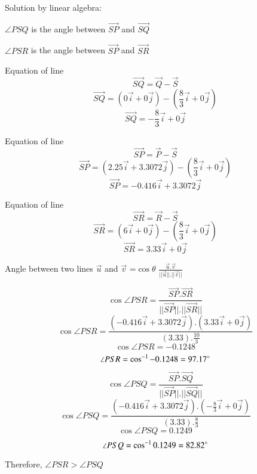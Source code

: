 Solution by linear algebra:

$\angle{PSQ}$ is the angle between $\vec{SP}$ and $\vec{SQ}$

$\angle{PSR}$ is the angle between $\vec{SP}$ and $\vec{SR}$

Equation of line $$\vec{SQ} = \vec{Q}-\vec{S}$$
$$\vec{SQ} = (0\vec{i}+0\vec{j}) - (\frac{8}{3}\vec{i}+0\vec{j})$$
$$\vec{SQ} = -\frac{8}{3}\vec{i}+0\vec{j}$$

Equation of line $$\vec{SP} = \vec{P}-\vec{S}$$
$$\vec{SP} = (2.25\vec{i}+3.3072\vec{j}) - (\frac{8}{3}\vec{i}+0\vec{j})$$
$$\vec{SP} = -0.416\vec{i}+3.3072\vec{j}$$

Equation of line $$\vec{SR} = \vec{R}-\vec{S}$$
$$\vec{SR} = (6\vec{i}+0\vec{j}) - (\frac{8}{3}\vec{i}+0\vec{j})$$
$$\vec{SR} = 3.33\vec{i}+0\vec{j}$$

Angle between two lines $\vec{u}$ and $\vec{v}$ =$\cos{\theta}$ $\frac{\vec{u}.\vec{v}}{||\vec{u}||.||\vec{v}||}$

$$\cos{\angle{PSR}} = \frac{\vec{SP}.\vec{SR}}{||\vec{SP}||.||\vec{SR}||}$$
$$\cos{\angle{PSR}} = \frac{(-0.416\vec{i}+3.3072\vec{j}).(3.33\vec{i}+0\vec{j})}{(3.33).\frac{10}{3}}$$
$$\cos{\angle{PSR}} = -0.1248$$
$$\angle{PSR} = \cos^{-1}{-0.1248} = 97.17\degree$$

$$\cos{\angle{PSQ}} = \frac{\vec{SP}.\vec{SQ}}{||\vec{SP}||.||\vec{SQ}||}$$
$$\cos{\angle{PSQ}} = \frac{(-0.416\vec{i}+3.3072\vec{j}).(-\frac{8}{3}\vec{i}+0\vec{j})}{(3.33).\frac{8}{3}}$$
$$\cos{\angle{PSQ}} = 0.1249$$
$$\angle{PSQ} = \cos^{-1}{0.1249} = 82.82\degree$$

Therefore, $\angle{PSR}>\angle{PSQ}$